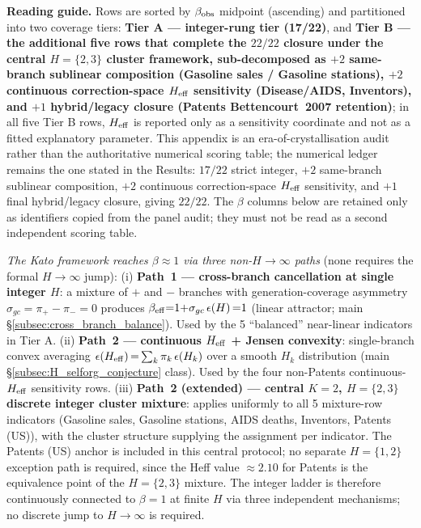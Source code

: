 \textbf{Reading guide.} Rows are sorted by $\beta_{\rm obs}$ midpoint (ascending) and partitioned into two coverage tiers: \textbf{Tier A --- integer-rung tier (17/22)}, and \textbf{Tier B --- the additional five rows that complete the $22/22$ closure under the central $H{=}\{2,3\}$ cluster framework, sub-decomposed as $+2$ same-branch sublinear composition (Gasoline sales / Gasoline stations), $+2$ continuous correction-space $H_{\mathrm{eff}}$ sensitivity (Disease/AIDS, Inventors), and $+1$ hybrid/legacy closure (Patents Bettencourt~2007 retention)}; in all five Tier B rows, $H_{\rm eff}$ is reported only as a sensitivity coordinate and not as a fitted explanatory parameter. This appendix is an era-of-crystallisation audit rather than the authoritative numerical scoring table; the numerical ledger remains the one stated in the Results: $17/22$ strict integer, $+2$ same-branch sublinear composition, $+2$ continuous correction-space $H_{\mathrm{eff}}$ sensitivity, and $+1$ final hybrid/legacy closure, giving $22/22$. The $\beta$ columns below are retained only as identifiers copied from the panel audit; they must not be read as a second independent scoring table.

\textit{The Kato framework reaches $\beta\!\approx\!1$ via three non-$H\!\to\!\infty$ paths} (none requires the formal $H\!\to\!\infty$ jump):
(i) \textbf{Path~1 — cross-branch cancellation at single integer $H$}: a mixture of $+$ and $-$ branches with generation-coverage asymmetry $\sigma_{gc}{=}\pi_{+}{-}\pi_{-}{=}0$ produces $\beta_{\mathrm{eff}}{=}1{+}\sigma_{gc}\,\epsilon\!\left(H\right){=}1$ (linear attractor; main \S\ref{subsec:cross_branch_balance}). Used by the 5 ``balanced'' near-linear indicators in Tier A.
(ii) \textbf{Path~2 — continuous $H_{\mathrm{eff}}$ + Jensen convexity}: single-branch convex averaging $\epsilon\!\left(H_{\mathrm{eff}}\right){=}\sum_k\pi_k\,\epsilon\!\left(H_k\right)$ over a smooth $H_k$ distribution (main \S\ref{subsec:H_selforg_conjecture} class). Used by the four non-Patents continuous-$H_{\mathrm{eff}}$ sensitivity rows.
(iii) \textbf{Path~2 (extended) — central $K{=}2$, $H{=}\{2,3\}$ discrete integer cluster mixture}: applies uniformly to all 5 mixture-row indicators (Gasoline sales, Gasoline stations, AIDS deaths, Inventors, Patents (US)), with the cluster structure supplying the assignment per indicator. The Patents (US) anchor is included in this central protocol; no separate $H{=}\{1,2\}$ exception path is required, since the Heff value $\approx 2.10$ for Patents is the equivalence point of the $H{=}\{2,3\}$ mixture.
The integer ladder is therefore continuously connected to $\beta{=}1$ at finite $H$ via three independent mechanisms; no discrete jump to $H\!\to\!\infty$ is required.

